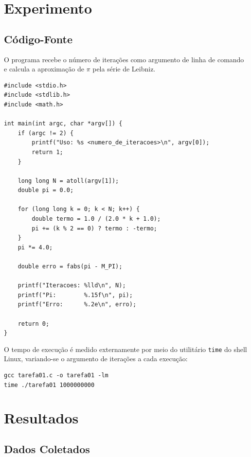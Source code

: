 \documentclass[11pt,letterpaper]{article}
\begin{document}
\newpage
\section{Experimento}

\subsection{Código-Fonte}
O programa recebe o número de iterações como argumento de linha de comando e calcula a aproximação de $\pi$ pela série de Leibniz.

\begin{lstlisting}[caption={Código-fonte em C para aproximação de $\pi$}, label={lst:codigo}]
#include <stdio.h>
#include <stdlib.h>
#include <math.h>

int main(int argc, char *argv[]) {
    if (argc != 2) {
        printf("Uso: %s <numero_de_iteracoes>\n", argv[0]);
        return 1;
    }

    long long N = atoll(argv[1]);
    double pi = 0.0;

    for (long long k = 0; k < N; k++) {
        double termo = 1.0 / (2.0 * k + 1.0);
        pi += (k % 2 == 0) ? termo : -termo;
    }
    pi *= 4.0;

    double erro = fabs(pi - M_PI);

    printf("Iteracoes: %lld\n", N);
    printf("Pi:        %.15f\n", pi);
    printf("Erro:      %.2e\n", erro);

    return 0;
}
\end{lstlisting}

O tempo de execução é medido externamente por meio do utilitário \texttt{time} do shell Linux, variando-se o argumento de iterações a cada execução:
\begin{lstlisting}[caption={Exemplo de execução com medição de tempo}, label={lst:execucao}]
gcc tarefa01.c -o tarefa01 -lm
time ./tarefa01 1000000000
\end{lstlisting}

\newpage
\section{Resultados}

\subsection{Dados Coletados}
\end{document}
